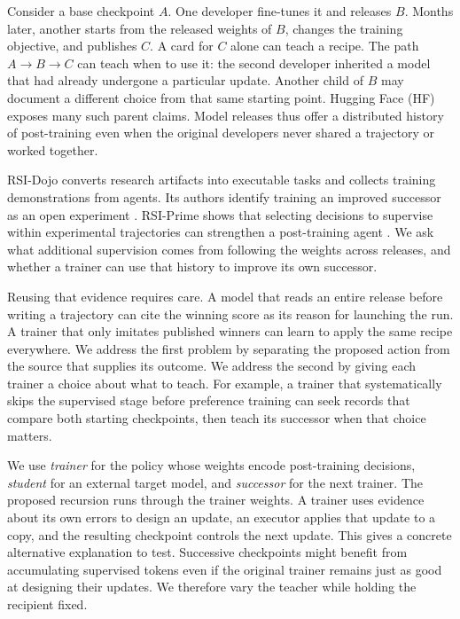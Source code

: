 \documentclass{article}
\begin{document}
Consider a base checkpoint \(A\). One developer fine-tunes it and releases \(B\). Months later, another starts from the released weights of \(B\), changes the training objective, and publishes \(C\). A card for \(C\) alone can teach a recipe. The path \(A\!\to\!B\!\to\!C\) can teach when to use it: the second developer inherited a model that had already undergone a particular update. Another child of \(B\) may document a different choice from that same starting point. Hugging Face (HF) exposes many such parent claims. Model releases thus offer a distributed history of post-training even when the original developers never shared a trajectory or worked together.

RSI-Dojo converts research artifacts into executable tasks and collects training demonstrations from agents. Its authors identify training an improved successor as an open experiment \citep{gao2026rsidojo}. RSI-Prime shows that selecting decisions to supervise within experimental trajectories can strengthen a post-training agent \citep{zheng2026rsiprime}. We ask what additional supervision comes from following the weights across releases, and whether a trainer can use that history to improve its own successor.

Reusing that evidence requires care. A model that reads an entire release before writing a trajectory can cite the winning score as its reason for launching the run. A trainer that only imitates published winners can learn to apply the same recipe everywhere. We address the first problem by separating the proposed action from the source that supplies its outcome. We address the second by giving each trainer a choice about what to teach. For example, a trainer that systematically skips the supervised stage before preference training can seek records that compare both starting checkpoints, then teach its successor when that choice matters.

We use \emph{trainer} for the policy whose weights encode post-training decisions, \emph{student} for an external target model, and \emph{successor} for the next trainer. The proposed recursion runs through the trainer weights. A trainer uses evidence about its own errors to design an update, an executor applies that update to a copy, and the resulting checkpoint controls the next update. This gives a concrete alternative explanation to test. Successive checkpoints might benefit from accumulating supervised tokens even if the original trainer remains just as good at designing their updates. We therefore vary the teacher while holding the recipient fixed.
\end{document}
